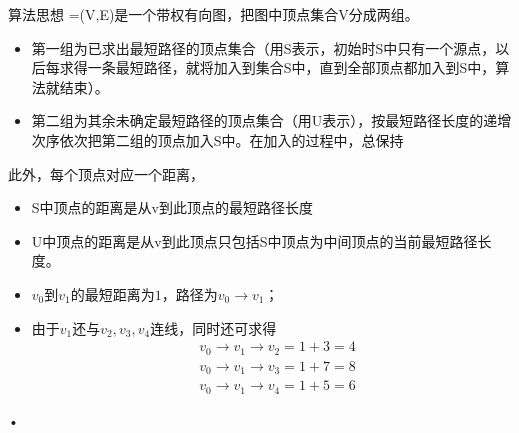 \begin{frame}\ft{\subsubsecname}
\begin{block}{算法思想}
=(V,E)是一个带权有向图，把图中顶点集合V分成两组。
\begin{itemize}
\item 第一组为已求出最短路径的顶点集合（用S表示，初始时S中只有一个源点，以后每求得一条最短路径，就将加入到集合S中，直到全部顶点都加入到S中，算法就结束）。\\[0.1in]
\item 第二组为其余未确定最短路径的顶点集合（用U表示），按最短路径长度的递增次序依次把第二组的顶点加入S中。在加入的过程中，总保持
\end{itemize}
此外，每个顶点对应一个距离，
\begin{itemize}
\item S中顶点的距离是从v到此顶点的最短路径长度
\item U中顶点的距离是从v到此顶点只包括S中顶点为中间顶点的当前最短路径长度。
\end{itemize}
\end{block}
\end{frame}

\begin{frame}\ft{\subsubsecname}
\begin{figure}
\centering


\end{figure}

\begin{itemize}
\item
$v_0$到$v_1$的最短距离为$1$，路径为$v_0\to v_1$；\\[0.1in]
\item
由于$v_1$还与$v_2,v_3,v_4$连线，同时还可求得
$$
\begin{aligned}
&v_0\to v_1 \to v_2=1+3=4\\
&v_0\to v_1 \to v_3=1+7=8\\
&v_0\to v_1 \to v_4=1+5=6
\end{aligned}
$$

\end{itemize}•

\end{frame}

